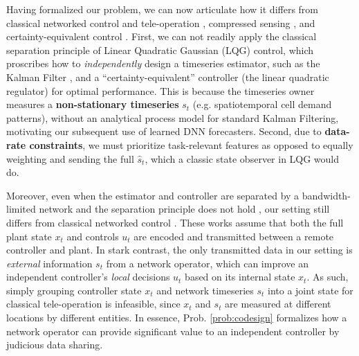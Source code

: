 Having formalized our problem, we can now articulate how it differs from classical networked control and tele-operation \cite{hespanha2007survey,borkar1997lqg,tatikonda2004control,tatikonda2004stochastic,kostina2019rate}, compressed sensing \cite{donoho2006compressed,eldar2012compressed}, and certainty-equivalent control \cite{van1981certainty,mania2019certainty}.
First, we can not readily apply the classical separation principle \cite{wonham1968separation} of Linear Quadratic Gaussian (LQG) control, which proscribes how to \textit{independently} design a timeseries estimator, such as the Kalman Filter \cite{kalman}, and a ``certainty-equivalent'' controller (the linear quadratic regulator) for optimal performance. This is because the timeseries owner measures a \textbf{non-stationary timeseries} $s_t$ (e.g. spatiotemporal cell demand patterns), without an analytical process model for standard Kalman Filtering, motivating our subsequent use of learned DNN forecasters. Second, due to \textbf{data-rate constraints}, we must prioritize task-relevant features as opposed to equally weighting and sending the full $\hat{s}_t$, which a classic state observer in LQG would do. 

Moreover, even when the estimator and controller are separated by a bandwidth-limited network and the separation principle does not hold \cite{6146405}, our setting still differs from classical networked control \cite{hespanha2007survey,borkar1997lqg,tatikonda2004control,tatikonda2004stochastic,kostina2019rate}. These works assume that both the full plant state $x_t$ and controls $u_t$ are encoded and transmitted between a remote controller and plant. In stark contrast, the only transmitted data in our setting is \textit{external} information $s_t$ from a network operator, which can improve an independent controller's \textit{local} decisions $u_t$ based on its internal state $x_t$. As such, simply grouping controller state $x_t$ and network timeseries $s_t$ into a joint state for classical tele-operation is infeasible, since $x_t$ and $s_t$ are measured at different locations by different entities. 
In essence, Prob. \ref{prob:codesign} formalizes how a network operator can provide significant value to an independent controller by judicious data sharing.

%

